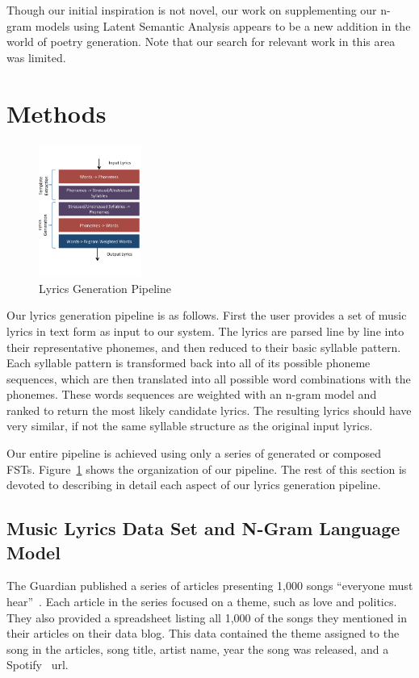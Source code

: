 \documentclass{vgtc}                          %
\begin{document}
Though our initial inspiration is not novel, our work on supplementing our n-gram
models using Latent Semantic Analysis appears to be a new addition
in the world of poetry generation. Note that our search for relevant work in this
area was limited.

\section{Methods}
\label{sec:methods}

\begin{figure}%
\centering
\includegraphics[width=0.3\textwidth]{images/pdf/pipeline.pdf}
\caption{Lyrics Generation Pipeline}
\label{fig:pipeline}
\end{figure}

Our lyrics generation pipeline is as follows. First the user provides
a set of music lyrics in text form as input to our system. The
lyrics are parsed line by line into their representative phonemes,
and then reduced to their basic syllable pattern.
Each syllable pattern is transformed back into all of its possible
phoneme sequences, which are then translated into all possible 
word combinations with the phonemes. These words sequences are weighted with
an n-gram model and ranked to return the most likely
candidate lyrics. The resulting lyrics should have very
similar, if not the same syllable structure as the original
input lyrics.

Our entire pipeline is achieved using only a series of
generated or composed FSTs. Figure~\ref{fig:pipeline}
shows the organization of our pipeline.
The rest of this section is devoted to describing
in detail each aspect of our lyrics generation pipeline.

\subsection{Music Lyrics Data Set and N-Gram Language Model}
The Guardian published a series of articles presenting 1,000 songs ``everyone must hear''~\cite{guardian}.
Each article in the series focused on a theme, such as love and politics.
They also provided a spreadsheet listing all 1,000 of the songs they mentioned in their articles
on their data blog\cite{guardian2}. This
data contained the theme assigned to the song in the articles,
song title, artist name, year the song was released, and a Spotify~\cite{spotify} url.
\end{document}
